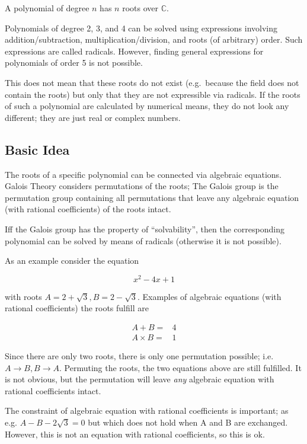 
A polynomial of degree \(n\) has \(n\) roots over \(\mathbb{C}\).

Polynomials of degree 2, 3, and 4 can be solved using expressions
involving addition/subtraction, multiplication/division, and roots (of
arbitrary) order. Such expressions are called radicals. However, finding
general expressions for polynomials of order 5 is not possible.

This does not mean that these roots do not exist (e.g.~because the field
does not contain the roots) but only that they are not expressible via
radicals. If the roots of such a polynomial are calculated by numerical
means, they do not look any different; they are just real or complex
numbers.

\subsection{Basic Idea}\label{basic-idea}

The roots of a specific polynomial can be connected via algebraic
equations. Galois Theory considers permutations of the roots; The Galois
group is the permutation group containing all permutations that leave
any algebraic equation (with rational coefficients) of the roots intact.

Iff the Galois group has the property of ``solvability'', then the
corresponding polynomial can be solved by means of radicals (otherwise
it is not possible).

As an example consider the equation

\[
x^2-4x+1
\]

with roots \(A = 2 + \sqrt{3}, B = 2 - \sqrt{3}\). Examples of algebraic
equations (with rational coefficients) the roots fulfill are


\begin{align}
A+B= & 4 \\
A \times B= &1
\end{align}


Since there are only two roots, there is only one permutation possible;
i.e. \(A \rightarrow B, B \rightarrow A\). Permuting the roots, the two
equations above are still fulfilled. It is not obvious, but the
permutation will leave \emph{any} algebraic equation with rational
coefficients intact.

The constraint of algebraic equation with rational coefficients is
important; as e.g. \(A - B - 2\sqrt{3}=0\) but which does not hold when
A and B are exchanged. However, this is not an equation with rational
coefficients, so this is ok.
